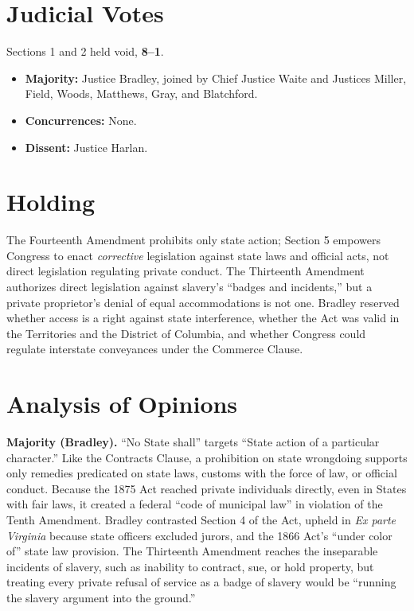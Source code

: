 \documentclass[12pt]{article}
\begin{document}
\section{Judicial Votes}

Sections 1 and 2 held void, \textbf{8--1}.
\begin{itemize}
\item \textbf{Majority:} Justice Bradley, joined by Chief Justice Waite and Justices Miller, Field, Woods, Matthews, Gray, and Blatchford.
\item \textbf{Concurrences:} None.
\item \textbf{Dissent:} Justice Harlan.
\end{itemize}

\section{Holding}

The Fourteenth Amendment prohibits only state action; Section 5 empowers Congress to enact \textit{corrective} legislation against state laws and official acts, not direct legislation regulating private conduct. The Thirteenth Amendment authorizes direct legislation against slavery's ``badges and incidents,'' but a private proprietor's denial of equal accommodations is not one. Bradley reserved whether access is a right against state interference, whether the Act was valid in the Territories and the District of Columbia, and whether Congress could regulate interstate conveyances under the Commerce Clause.

\section{Analysis of Opinions}

\textbf{Majority (Bradley).} ``No State shall'' targets ``State action of a particular character.'' Like the Contracts Clause, a prohibition on state wrongdoing supports only remedies predicated on state laws, customs with the force of law, or official conduct. Because the 1875 Act reached private individuals directly, even in States with fair laws, it created a federal ``code of municipal law'' in violation of the Tenth Amendment. Bradley contrasted Section 4 of the Act, upheld in \textit{Ex parte Virginia} because state officers excluded jurors, and the 1866 Act's ``under color of'' state law provision. The Thirteenth Amendment reaches the inseparable incidents of slavery, such as inability to contract, sue, or hold property, but treating every private refusal of service as a badge of slavery would be ``running the slavery argument into the ground.''
\end{document}

